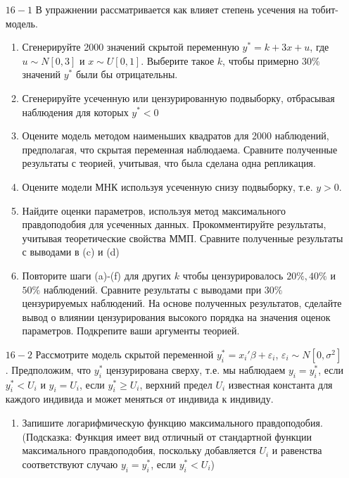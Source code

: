 \begin{enumerate}
\item [$16 - 1$] В упражнении рассматривается как влияет степень усечения на тобит-модель.
\begin{enumerate}
\item Сгенерируйте 2000 значений скрытой переменную $y^* =k+3x+u$, где $u \sim N[0,3]$ и $x \sim U[0,1]$. Выберите такое $k$, чтобы примерно $30\%$ значений $y^* $ были бы отрицательны.

\item Сгенерируйте усеченную или цензурированную подвыборку, отбрасывая наблюдения для которых $y^* <0$

\item Оцените модель методом наименьших квадратов для 2000 наблюдений, предполагая, что скрытая переменная наблюдаема. Сравните полученные результаты с теорией, учитывая, что была сделана одна репликация.

\item  Оцените модели МНК используя усеченную снизу подвыборку, т.е. $y>0$.

\item Найдите оценки параметров, используя метод максимального правдоподобия для усеченных данных. Прокомментируйте результаты, учитывая теоретические свойства ММП. Сравните полученные результаты с выводами в (c) и (d)

\item  Повторите шаги (a)-(f) для других $k$ чтобы цензурировалось $20\%, 40\%$ и $50\%$ наблюдений. Сравните результаты с выводами при $30\%$ цензурируемых наблюдений. На основе полученных результатов, сделайте вывод о влиянии цензурирования высокого порядка на значения оценок параметров. Подкрепите ваши аргументы теорией.
\end{enumerate}

\item [$16 - 2$] Рассмотрите модель скрытой переменной $y_i^{*}=x_i'\beta+\varepsilon_i$, $\varepsilon_i \sim N[0,\sigma^2]$. Предположим, что $y_i^{*}$ цензурирована сверху, т.е. мы наблюдаем $y_i=y_i^{*}$, если $y_i^{*}<U_i$ и $y_i=U_i$, если $y_i^{*}\geq U_i$, верхний предел $U_i$ известная константа для каждого индивида и может меняться от индивида к индивиду.
\begin{enumerate}
\item  Запишите логарифмическую функцию максимального правдоподобия. (Подсказка: Функция имеет вид отличный от стандартной функции максимального правдоподобия, поскольку добавляется  $U_i$ и равенства соответствуют случаю $y_i=y_i^{*}$, если $y_i^{*}<U_i$)


\end{enumerate}
\end{enumerate}
